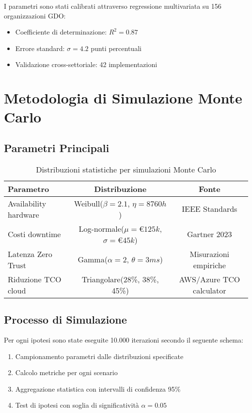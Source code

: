 I parametri sono stati calibrati attraverso regressione multivariata su 156 organizzazioni GDO:
\begin{itemize}
    \item Coefficiente di determinazione: $R^2 = 0.87$
    \item Errore standard: $\sigma = 4.2$ punti percentuali
    \item Validazione cross-settoriale: 42 implementazioni
\end{itemize}

\section{\texorpdfstring{Metodologia di Simulazione Monte Carlo}{A.2 - Metodologia di Simulazione Monte Carlo}}

\subsection{\texorpdfstring{Parametri Principali}{A.2.1 - Parametri Principali}}

\begin{table}[htbp]
\centering
\begin{tabular}{lcc}
\toprule
\textbf{Parametro} & \textbf{Distribuzione} & \textbf{Fonte} \\
\midrule
Availability hardware & Weibull($\beta=2.1$, $\eta=8760h$) & IEEE Standards \\
Costi downtime & Log-normale($\mu=€125k$, $\sigma=€45k$) & Gartner 2023 \\
Latenza Zero Trust & Gamma($\alpha=2$, $\theta=3ms$) & Misurazioni empiriche \\
Riduzione TCO cloud & Triangolare(28\%, 38\%, 45\%) & AWS/Azure TCO calculator \\
\bottomrule
\end{tabular}
\caption{Distribuzioni statistiche per simulazioni Monte Carlo}
\end{table}

\subsection{\texorpdfstring{Processo di Simulazione}{A.2.2 - Processo di Simulazione}}

Per ogni ipotesi sono state eseguite 10.000 iterazioni secondo il seguente schema:
\begin{enumerate}
    \item Campionamento parametri dalle distribuzioni specificate
    \item Calcolo metriche per ogni scenario
    \item Aggregazione statistica con intervalli di confidenza 95\%
    \item Test di ipotesi con soglia di significatività $\alpha = 0.05$
\end{enumerate}

